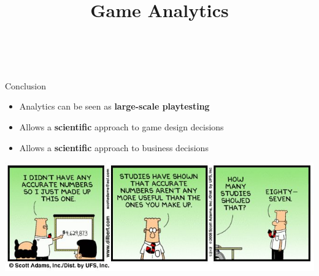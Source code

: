 \usepackage{../../beamerthemeFalmouthGamesAcademy}
\usepackage{multimedia}
\graphicspath{ {../../} }


\usepackage[normalem]{ulem}
\usepackage{wasysym}

\usepackage{pdfpages}

\usetikzlibrary{arrows,automata}




\title{Game Analytics}
\subtitle{\modulecode\ \moduletitle}

\frame{\titlepage}











\begin{frame}{Conclusion}
	\begin{itemize}
		\pause\item Analytics can be seen as \textbf{large-scale playtesting}
		\pause\item Allows a \textbf{scientific} approach to game design decisions
		\pause\item Allows a \textbf{scientific} approach to business decisions
	\end{itemize}
\end{frame}

\begin{frame}
	\begin{center}
		\includegraphics[width=\textwidth]{dilbert}
	\end{center}
\end{frame}


